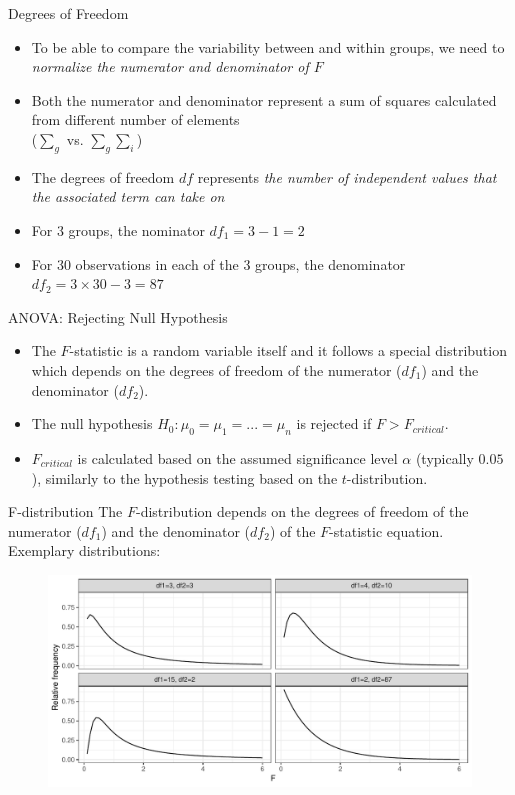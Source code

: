 \begin{frame}{Degrees of Freedom}
    \begin{itemize}
        \item To be able to compare the variability between and within groups, we need to \emph{normalize the numerator and denominator of $F$}
        \item Both the numerator and denominator represent a sum of squares calculated from different number of elements\\
        ($\sum_g$ vs. $\sum_g \sum_i$)
        \item The degrees of freedom $df$ represents \emph{the number of independent values that the associated term can take on}
        \item For 3 groups, the nominator $df_1 = 3 - 1 = 2$
        \item For 30 observations in each of the 3 groups, the denominator $df_2 = 3 \times 30 - 3 = 87$
    \end{itemize}
\end{frame}

\begin{frame}{ANOVA: Rejecting Null Hypothesis}
    \begin{itemize}
    \item The $F$-statistic is a random variable itself and it follows a special distribution which depends on the degrees of freedom of the numerator ($df_1$) and the denominator ($df_2$).
        
    \item The null hypothesis $H_0: \mu_0 = \mu_1 = ... = \mu_n$ is rejected if $F > F_{critical}$.

    \item $F_{critical}$ is calculated based on the assumed significance level $\alpha$ (typically $0.05$), similarly to the hypothesis testing based on the $t$-distribution.
    \end{itemize}
\end{frame}

\begin{frame}{F-distribution}
    The $F$-distribution depends on the degrees of freedom of the numerator ($df_1$) and the denominator ($df_2$) of the $F$-statistic equation. Exemplary distributions:
    
    \begin{figure}
        \includegraphics[width=\textwidth]{R/plots/f_distribution}
    \end{figure}
\end{frame}

